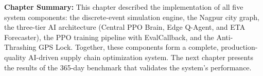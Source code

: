 \vspace{1cm}
\noindent \textbf{Chapter Summary:} This chapter described the implementation of
all five system components: the discrete-event simulation engine, the Nagpur city
graph, the three-tier AI architecture (Central PPO Brain, Edge Q-Agent, and ETA
Forecaster), the PPO training pipeline with EvalCallback, and the Anti-Thrashing
GPS Lock. Together, these components form a complete, production-quality AI-driven
supply chain optimization system. The next chapter presents the results of the
365-day benchmark that validates the system's performance.
